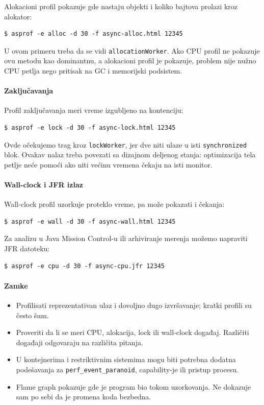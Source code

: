 Alokacioni profil pokazuje gde nastaju objekti i koliko bajtova prolazi kroz alokator:

\begin{verbatim}
$ asprof -e alloc -d 30 -f async-alloc.html 12345
\end{verbatim}

U ovom primeru treba da se vidi \texttt{allocationWorker}. Ako CPU profil ne pokazuje ovu metodu kao dominantnu, a alokacioni profil je pokazuje, problem nije nužno CPU petlja nego pritisak na GC i memorijski podsistem.

\paragraph{Zaključavanja}\label{async-profiler-lock}

Profil zaključavanja meri vreme izgubljeno na kontenciju:

\begin{verbatim}
$ asprof -e lock -d 30 -f async-lock.html 12345
\end{verbatim}

Ovde očekujemo trag kroz \texttt{lockWorker}, jer dve niti ulaze u isti \texttt{synchronized} blok. Ovakav nalaz treba povezati sa dizajnom deljenog stanja: optimizacija tela petlje neće pomoći ako niti većinu vremena čekaju na isti monitor.

\paragraph{Wall-clock i JFR izlaz}\label{async-profiler-wall-jfr}

Wall-clock profil uzorkuje proteklo vreme, pa može pokazati i čekanja:

\begin{verbatim}
$ asprof -e wall -d 30 -f async-wall.html 12345
\end{verbatim}

Za analizu u Java Mission Control-u ili arhiviranje merenja možemo napraviti JFR datoteku:

\begin{verbatim}
$ asprof -e cpu -d 30 -f async-cpu.jfr 12345
\end{verbatim}

\paragraph{Zamke}\label{async-profiler-zamke}

\begin{itemize}
\tightlist
\item
  Profilisati reprezentativan ulaz i dovoljno dugo izvršavanje; kratki profili su često šum.
\item
  Proveriti da li se meri CPU, alokacija, lock ili wall-clock događaj. Različiti događaji odgovaraju na različita pitanja.
\item
  U kontejnerima i restriktivnim sistemima mogu biti potrebna dodatna podešavanja za \texttt{perf\_event\_paranoid}, capability-je ili pristup procesu.
\item
  Flame graph pokazuje gde je program bio tokom uzorkovanja. Ne dokazuje sam po sebi da je promena koda bezbedna.
\end{itemize}
